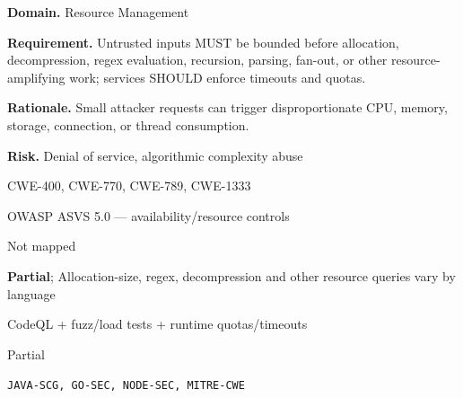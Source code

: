 \documentclass[10pt,letterpaper]{article}
\newcommand{\prioritybadge}[2]{\tcbox[on line,boxrule=0pt,arc=1.2mm,boxsep=0.7mm,left=1mm,right=1mm,top=0.4mm,bottom=0.4mm,colback=#2!12,coltext=#2]{\scriptsize\bfseries #1}}
\begin{document}
\begin{rulebox}[title={\texttt{SCS-ALL-RESOURCE-001} \hfill \prioritybadge{High Priority}{High}}]
\textbf{Domain.} Resource Management

\textbf{Requirement.} Untrusted inputs MUST be bounded before allocation, decompression, regex evaluation, recursion, parsing, fan-out, or other resource-amplifying work; services SHOULD enforce timeouts and quotas.

\textbf{Rationale.} Small attacker requests can trigger disproportionate CPU, memory, storage, connection, or thread consumption.

\textbf{Risk.} Denial of service, algorithmic complexity abuse

\begin{description}[leftmargin=2.65cm,labelwidth=2.3cm,style=nextline,itemsep=1pt,topsep=3pt]
  \item[CWE] CWE-400, CWE-770, CWE-789, CWE-1333
  \item[OWASP] OWASP ASVS 5.0 --- availability/resource controls
  \item[CERT] Not mapped
  \item[CodeQL] \textbf{Partial}; Allocation-size, regex, decompression and other resource queries vary by language
  \item[Enforcement] CodeQL + fuzz/load tests + runtime quotas/timeouts
  \item[Automation] Partial
  \item[Sources] \texttt{JAVA-SCG, GO-SEC, NODE-SEC, MITRE-CWE}
\end{description}
\end{rulebox}
\end{document}
